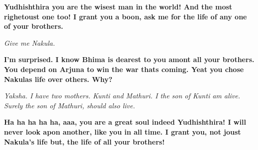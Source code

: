 \textbf{
Yudhishthira you are the wisest man in the world! And the most righetoust one too!
I grant you a boon, ask me for the life of any one of your brothers.
}\medskip

\textit{
Give me Nakula.
}\medskip

\textbf{
I'm surprised. I know Bhima is dearest to you amont all your brothers. You depend on Arjuna to win the war thats coming. Yeat you chose Nakulas life over others. Why?
}\medskip

\textit{
Yaksha. I have two mothers. Kunti and Mathuri. I the son of Kunti am alive. Surely the son of Mathuri, should also live.
}\medskip

\textbf{
Ha ha ha ha ha, aaa, you are a great soul indeed Yudhishthira! I will never look apon another, like you in all time.
I grant you, not joust Nakula's life but, the life of all your brothers!
}\medskip

